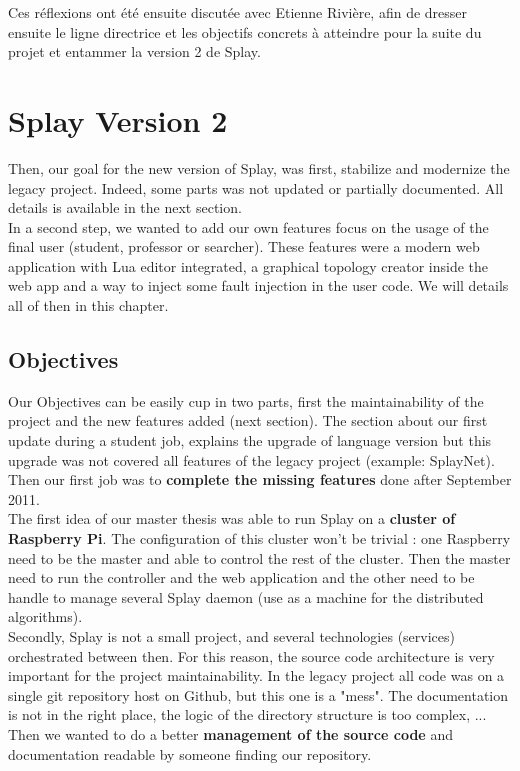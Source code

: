 \documentclass{eplmastersthesis}
\begin{document}
        Ces réflexions ont été ensuite discutée avec Etienne Rivière, afin de
        dresser ensuite le ligne directrice et les objectifs concrets à atteindre
        pour la suite du projet et entammer la version 2 de Splay.
        
  \chapter{Splay Version 2}

    Then, our goal for the new version of Splay, was first, stabilize and modernize the legacy project. Indeed, some parts was not updated or partially documented. All details is available in the next section.\\
    
    In a second step, we wanted to add our own features focus on the usage of the final user (student, professor or searcher). These features were a modern web application with Lua editor integrated, a graphical topology creator inside the web app and a way to inject some fault injection in the user code. We will details all of then in this chapter.

    \section{Objectives}
      
      Our Objectives can be easily cup in two parts, first the maintainability of the project and the new features added (next section). The section about our first update during a student job, explains the upgrade of language version but this upgrade was not covered all features of the legacy project (example: SplayNet). Then our first job was to\textbf{ complete the missing features} done after  September 2011. \\
      
      The first idea of our master thesis was able to run Splay on a \textbf{cluster of Raspberry Pi}. The configuration of this cluster won't be trivial : one Raspberry need to be the master and able to control the rest of the cluster. Then the master need to run the controller and the web application and the other need to be handle to manage several Splay daemon (use as a machine for the distributed algorithms). \\
      
      Secondly, Splay is not a small project, and several technologies (services) orchestrated between then. For this reason, the source code architecture is very important for the project maintainability. In the legacy project all code was on a single git repository host on Github, but this one is a "mess". The documentation is not in the right place, the logic of the directory structure is too complex, ... Then we wanted to do a better \textbf{management of the source code} and documentation readable by someone finding our repository. \\
      
\end{document}
